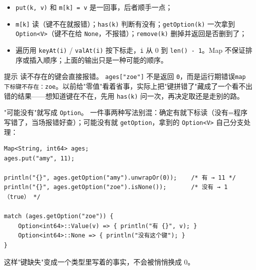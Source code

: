 \begin{itemize}

\item \texttt{put(\allowbreak{}k,\allowbreak{} v)\allowbreak{}} 和 \texttt{m[\allowbreak{}k]\allowbreak{} =\allowbreak{} v} 是一回事，后者顺手一点；

\item \texttt{m[\allowbreak{}k]\allowbreak{}} 读（键不在就报错）；\texttt{has(\allowbreak{}k)\allowbreak{}} 判断有没有；\texttt{get\allowbreak{}Option(\allowbreak{}k)\allowbreak{}} 一次拿到 \texttt{Option<\allowbreak{}V>\allowbreak{}}（键不在给 \texttt{None}，不报错）；\texttt{remove(\allowbreak{}k)\allowbreak{}} 删掉并返回是否删到了；

\item 遍历用 \texttt{key\allowbreak{}At(\allowbreak{}i)\allowbreak{}} / \texttt{val\allowbreak{}At(\allowbreak{}i)\allowbreak{}} 按下标走，\texttt{i} 从 0 到 \texttt{len(\allowbreak{})\allowbreak{} - 1}。Map 不保证排序或插入顺序；上面的输出只是一种可能的顺序。

\end{itemize}

\begin{tip}{提示}
读不存在的键会直接报错。 \texttt{ages[\allowbreak{}"zoe"]\allowbreak{}} 不是返回 \texttt{0}，而是运行期错误\texttt{map 下标键不存在：zoe}。以前给"零值"看着省事，实际上把"键拼错了"藏成了一个看不出错的结果——想知道键在不在，先用 \texttt{has(\allowbreak{}k)\allowbreak{}} 问一次，再决定取还是走别的路。
\end{tip}

"可能没有"就写成 \texttt{Option}。 一件事两种写法别混：确定有就下标读（没有=程序写错了，当场报错好查）；可能没有就 \texttt{get\allowbreak{}Option}，拿到的 \texttt{Option<\allowbreak{}V>\allowbreak{}} 自己分支处理：

\par
\medskip
\begin{lstlisting}[style=chali]
Map<String, int64> ages;
ages.put("amy", 11);

println("{}", ages.getOption("amy").unwrapOr(0));    /* 有 → 11 */
println("{}", ages.getOption("zoe").isNone());       /* 没有 → 1（true） */

match (ages.getOption("zoe")) {
    Option<int64>::Value(v) => { println("有 {}", v); }
    Option<int64>::None => { println("没有这个键"); }
}
\end{lstlisting}
\par
\medskip

这样"键缺失"变成一个类型里写着的事实，不会被悄悄换成 0。

